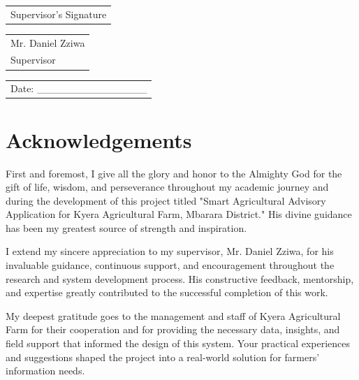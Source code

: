 \documentclass[12pt]{report}
\begin{document}
\vspace{2cm}

\begin{center}
\begin{tabular}{p{}}
    \hline
    \centering Supervisor's Signature \\
\end{tabular}

\vspace{0.5cm}

\begin{tabular}{p{}}
    \centering Mr. Daniel Zziwa \\
    \centering Supervisor \\
\end{tabular}

\vspace{0.5cm}

\begin{tabular}{p{}}
    \centering Date: \_\_\_\_\_\_\_\_\_\_\_\_\_\_\_ \\
\end{tabular}
\end{center}

\vfill

\newpage
\thispagestyle{empty}
\chapter*{Acknowledgements}

First and foremost, I give all the glory and honor to the Almighty God for the gift of life, wisdom, and perseverance throughout my academic journey and during the development of this project titled "Smart Agricultural Advisory Application for Kyera Agricultural Farm, Mbarara District." His divine guidance has been my greatest source of strength and inspiration.

I extend my sincere appreciation to my supervisor, Mr. Daniel Zziwa, for his invaluable guidance, continuous support, and encouragement throughout the research and system development process. His constructive feedback, mentorship, and expertise greatly contributed to the successful completion of this work.

My deepest gratitude goes to the management and staff of Kyera Agricultural Farm for their cooperation and for providing the necessary data, insights, and field support that informed the design of this system. Your practical experiences and suggestions shaped the project into a real-world solution for farmers' information needs.
\end{document}

